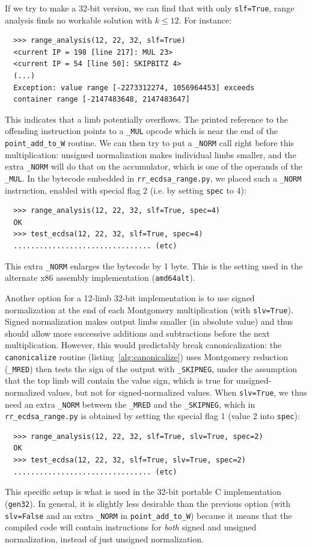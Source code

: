 \documentclass{llncs}
\begin{document}
If we try to make a 32-bit version, we can find that with only
\verb+slf=True+, range analysis finds no workable solution with $k\leq 12$.
For instance:
{\small\begin{verbatim}
  >>> range_analysis(12, 22, 32, slf=True)
  <current IP = 198 [line 217]: MUL 23>
  <current IP = 54 [line 50]: SKIPBITZ 4>
  (...)
  Exception: value range [-2273312274, 1056964453] exceeds
  container range [-2147483648, 2147483647]
\end{verbatim}}
This indicates that a limb potentially overflows. The printed reference
to the offending instruction points to a \verb+_MUL+ opcode which is
near the end of the \verb+point_add_to_W+ routine. We can then try to
put a \verb+_NORM+ call right before this multiplication: unsigned
normalization makes individual limbs smaller, and the extra \verb+_NORM+
will do that on the accumulator, which is one of the operands of the
\verb+_MUL+. In the bytecode embedded in \verb+rr_ecdsa_range.py+,
we placed such a \verb+_NORM+ instruction, enabled with special flag 2
(i.e. by setting \verb+spec+ to 4):
{\small\begin{verbatim}
  >>> range_analysis(12, 22, 32, slf=True, spec=4)
  OK
  >>> test_ecdsa(12, 22, 32, slf=True, spec=4)
  ................................ (etc)
\end{verbatim}}
This extra \verb+_NORM+ enlarges the bytecode by 1 byte. This is the
setting used in the alternate x86 assembly implementation
(\verb+amd64alt+).

Another option for a 12-limb 32-bit implementation is to use signed
normalization at the end of each Montgomery multiplication (with
\verb+slv=True+). Signed normalization makes output limbs smaller (in
absolute value) and thus should allow more successive additions and
subtractions before the next multiplication. However, this would
predictably break canonicalization: the \verb+canonicalize+ routine
(listing~\ref{alg:canonicalize}) uses Montgomery reduction
(\verb+_MRED+) then tests the sign of the output with \verb+_SKIPNEG+,
under the assumption that the top limb will contain the value sign,
which is true for unsigned-normalized values, but not for
signed-normalized values. When \verb+slv=True+, we thus need an extra
\verb+_NORM+ between the \verb+_MRED+ and the \verb+_SKIPNEG+, which in
\verb+rr_ecdsa_range.py+ is obtained by setting the special flag 1
(value 2 into \verb+spec+):
{\small\begin{verbatim}
  >>> range_analysis(12, 22, 32, slf=True, slv=True, spec=2)
  OK
  >>> test_ecdsa(12, 22, 32, slf=True, slv=True, spec=2)
  ................................ (etc)
\end{verbatim}}
This specific setup is what is used in the 32-bit portable C
implementation (\verb+gen32+). In general, it is slightly less desirable
than the previous option (with \verb+slv=False+ and an extra
\verb+_NORM+ in \verb+point_add_to_W+) because it means that the
compiled code will contain instructions for \emph{both} signed and
unsigned normalization, instead of just unsigned normalization.
\end{document}
